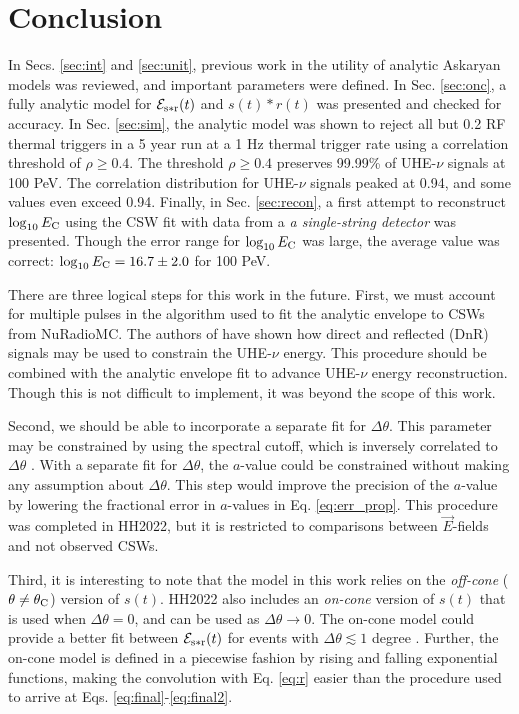 \documentclass[amsmath,amssymb,aps,prd,10pt,twocolumn,showkeys]{revtex4}
\begin{document}
\section{Conclusion}
\label{sec:conc}

In Secs. \ref{sec:int} and \ref{sec:unit}, previous work in the utility of analytic Askaryan models was reviewed, and important parameters were defined.  In Sec. \ref{sec:onc}, a fully analytic model for $\mathcal{E}_{\rm s*r}(t)$ and $s(t) * r(t)$ was presented and checked for accuracy.  In Sec. \ref{sec:sim}, the analytic model was shown to reject all but 0.2 RF thermal triggers in a 5 year run at a 1 Hz thermal trigger rate using a correlation threshold of $\rho\geq 0.4$.  The threshold $\rho\geq 0.4$ preserves 99.99\% of UHE-$\nu$ signals at 100 PeV.  The correlation distribution for UHE-$\nu$ signals peaked at 0.94, and some values even exceed 0.94.  Finally, in Sec. \ref{sec:recon}, a first attempt to reconstruct $\log_{10}E_{\rm C}$ using the CSW fit with data from a \textit{a single-string detector} was presented.  Though the error range for $\log_{10}E_{\rm C}$ was large, the average value was correct: $\log_{10}E_{\rm C} = 16.7 \pm 2.0$ for 100 PeV.

There are three logical steps for this work in the future.  First, we must account for multiple pulses in the algorithm used to fit the analytic envelope to CSWs from NuRadioMC.  The authors of \cite{anker2019neutrino-734} have shown how direct and reflected (DnR) signals may be used to constrain the UHE-$\nu$ energy.  This procedure should be combined with the analytic envelope fit to advance UHE-$\nu$ energy reconstruction.  Though this is not difficult to implement, it was beyond the scope of this work.

Second, we should be able to incorporate a separate fit for $\Delta\theta$.  This parameter may be constrained by using the spectral cutoff, which is inversely correlated to $\Delta\theta$ \cite{10.1016/j.astropartphys.2017.03.008}.  With a separate fit for $\Delta\theta$, the $a$-value could be constrained without making any assumption about $\Delta\theta$.  This step would improve the precision of the $a$-value by lowering the fractional error in $a$-values in Eq. \ref{eq:err_prop}.  This procedure was completed in HH2022, but it is restricted to comparisons between $\vec{E}$-fields and not observed CSWs.

Third, it is interesting to note that the model in this work relies on the \textit{off-cone} ($\theta \neq \theta_{\rm C}$) version of $s(t)$.  HH2022 also includes an \textit{on-cone} version of $s(t)$ that is used when $\Delta\theta = 0$, and can be used as $\Delta\theta\to 0$.  The on-cone model could provide a better fit between $\mathcal{E}_{\rm s*r}(t)$ for events with $\Delta\theta \lesssim 1$ degree \cite{PhysRevD.105.123019}.  Further, the on-cone model is defined in a piecewise fashion by rising and falling exponential functions, making the convolution with Eq. \ref{eq:r} easier than the procedure used to arrive at Eqs. \ref{eq:final}-\ref{eq:final2}.
\end{document}
